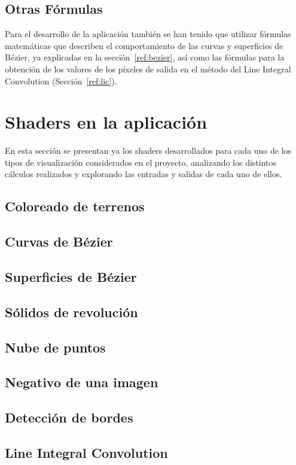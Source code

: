 \subsection{Otras Fórmulas}
\label{makereference5.4.4}

Para el desarrollo de la aplicación también se han tenido que utilizar fórmulas
matemáticas que describen el comportamiento de las curvas y superficies de
Bézier, ya explicadas en la sección~\ref{ref:bezier}, así como las
fórmulas para la obtención de los valores de los píxeles de salida en el método
del Line Integral Convolution (Sección~\ref{ref:lic}).

\section{Shaders en la aplicación}
\label{makereference5.5}

En esta sección se presentan ya los shaders desarrollados para cada uno de los
tipos de visualización considerados en el proyecto, analizando los distintos
cálculos realizados y explorando las entradas y salidas de cada uno de ellos.

\subsection{Coloreado de terrenos}
\label{makereference5.5.1}
\subsection{Curvas de Bézier}
\label{makereference5.5.2}
\subsection{Superficies de Bézier}
\label{makereference5.5.3}
\subsection{Sólidos de revolución}
\label{makereference5.5.4}
\subsection{Nube de puntos}
\label{makereference5.5.5}
\subsection{Negativo de una imagen}
\label{makereference5.5.6}
\subsection{Detección de bordes}
\label{makereference5.5.7}
\subsection{Line Integral Convolution}
\label{makereference5.5.8}
